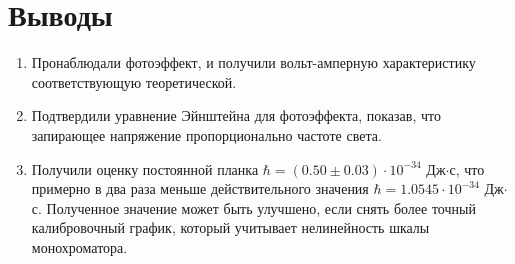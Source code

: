 \documentclass[a4paper,12pt]{article}
\begin{document}
\section{Выводы}
\begin{enumerate}
\item Пронаблюдали фотоэффект, и получили вольт-амперную характеристику соответствующую теоретической.
\item Подтвердили уравнение Эйнштейна для фотоэффекта, показав, что запирающее напряжение пропорционально частоте света.
\item Получили оценку постоянной планка $\hbar = (0.50 \pm 0.03) \cdot 10^{-34}$ Дж$\cdot$с, что примерно в два раза меньше действительного значения $\hbar = 1.0545 \cdot 10^{-34}$ Дж$\cdot$с. Полученное значение может быть улучшено, если снять более точный калибровочный график, который учитывает нелинейность шкалы монохроматора.
\end{enumerate}
\end{document}
